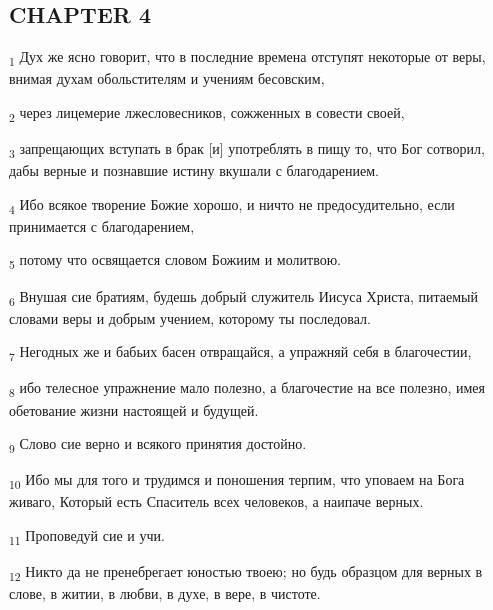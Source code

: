 \subsection{CHAPTER 4}
\begin{tcolorbox}
\textsubscript{1} Дух же ясно говорит, что в последние времена отступят некоторые от веры, внимая духам обольстителям и учениям бесовским,
\end{tcolorbox}
\begin{tcolorbox}
\textsubscript{2} через лицемерие лжесловесников, сожженных в совести своей,
\end{tcolorbox}
\begin{tcolorbox}
\textsubscript{3} запрещающих вступать в брак [и] употреблять в пищу то, что Бог сотворил, дабы верные и познавшие истину вкушали с благодарением.
\end{tcolorbox}
\begin{tcolorbox}
\textsubscript{4} Ибо всякое творение Божие хорошо, и ничто не предосудительно, если принимается с благодарением,
\end{tcolorbox}
\begin{tcolorbox}
\textsubscript{5} потому что освящается словом Божиим и молитвою.
\end{tcolorbox}
\begin{tcolorbox}
\textsubscript{6} Внушая сие братиям, будешь добрый служитель Иисуса Христа, питаемый словами веры и добрым учением, которому ты последовал.
\end{tcolorbox}
\begin{tcolorbox}
\textsubscript{7} Негодных же и бабьих басен отвращайся, а упражняй себя в благочестии,
\end{tcolorbox}
\begin{tcolorbox}
\textsubscript{8} ибо телесное упражнение мало полезно, а благочестие на все полезно, имея обетование жизни настоящей и будущей.
\end{tcolorbox}
\begin{tcolorbox}
\textsubscript{9} Слово сие верно и всякого принятия достойно.
\end{tcolorbox}
\begin{tcolorbox}
\textsubscript{10} Ибо мы для того и трудимся и поношения терпим, что уповаем на Бога живаго, Который есть Спаситель всех человеков, а наипаче верных.
\end{tcolorbox}
\begin{tcolorbox}
\textsubscript{11} Проповедуй сие и учи.
\end{tcolorbox}
\begin{tcolorbox}
\textsubscript{12} Никто да не пренебрегает юностью твоею; но будь образцом для верных в слове, в житии, в любви, в духе, в вере, в чистоте.
\end{tcolorbox}
